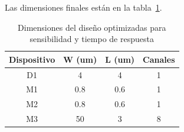 Las dimensiones finales están en la tabla~\ref{fig:areas_aps}.
\begin{table}[h]
    \centering
    \caption{Dimensiones del diseño optimizadas para sensibilidad y tiempo de
    respuesta}
    \begin{tabular}{|c|c|c|c|}
        \hline
        Dispositivo&      W (um)&    L (um)&  Canales\\
        \hline
D1&     4&  4&  1\\
M1&     0.8&    0.6&    1\\
M2&     0.8&    0.6&    1\\
M3&     50& 3&  8\\
        \hline
    \end{tabular}
    \label{fig:areas_aps}
\end{table}

